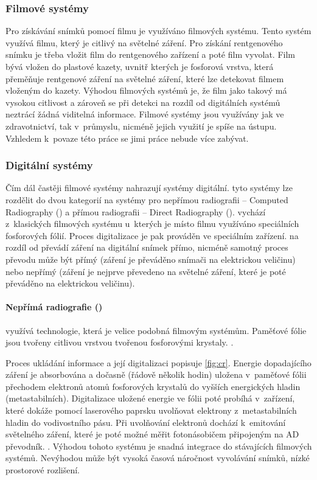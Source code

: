 \subsubsection{Filmové systémy}
Pro získávání snímků pomocí filmu je využíváno filmových systému. Tento systém využívá filmu, který je citlivý na světelné záření. Pro získání rentgenového snímku je třeba vložit film do rentgenového zařízení a poté film vyvolat. Film bývá vložen do plastové kazety, uvnitř kterých je fosforová vrstva, která přeměňuje rentgenové záření na světelné záření, které lze detekovat filmem vloženým do kazety. Výhodou filmových systémů je, že film jako takový má vysokou citlivost a zároveň se při detekci na rozdíl od digitálních systémů neztrácí žádná viditelná informace. \cite[str.~155]{Diagnostic-Radiology-Physics} Filmové systémy jsou využívány jak ve zdravotnictví, tak v~průmyslu, nicméně jejich využití je spíše na ústupu. Vzhledem k~povaze této práce se jimi práce nebude více zabývat.

\subsubsection{Digitální systémy}
Čím dál častěji filmové systémy nahrazují systémy digitální. tyto systémy lze rozdělit do dvou kategorií na systémy pro nepřímou radiografii -- Computed Radiography () a přímou radiografii -- Direct Radiography  ().  vychází z~klasických filmových systému u~kterých je místo filmu využíváno speciálních fosforových fólií. Proces digitalizace je pak prováděn ve speciálním zařízení.
 na rozdíl od  převádí záření na digitální snímek přímo, nicméně samotný proces převodu může být přímý (záření je převáděno snímači na elektrickou veličinu) nebo nepřímý (záření je nejprve převedeno na světelné záření, které je poté převáděno na elektrickou veličinu). \cite[str.~676]{Advances-in-Digital-Radiography}

\paragraph{Nepřímá radiografie ()}
využívá technologie, která je velice podobná filmovým systémům. Paměťové fólie jsou tvořeny citlivou vrstvou tvořenou fosforovými krystaly. \cite[str.~676]{Advances-in-Digital-Radiography}. 

Proces ukládání informace a její digitalizaci popisuje \cref{fig:cr}. Energie dopadajícího záření je absorbována a dočasně (řádově několik hodin) uložena v~paměťové fólii přechodem elektronů atomů fosforových krystalů do vyšších energických hladin (metastabilních). Digitalizace uložené energie ve fólii poté probíhá v~zařízení, které dokáže pomocí laserového paprsku uvolňovat elektrony z~metastabilních hladin do vodivostního pásu. Při uvolňování elektronů dochází k~emitování světelného záření, které je poté možné měřit fotonásobičem připojeným na AD převodník. \cite[str.~677]{Advances-in-Digital-Radiography}. Výhodou tohoto systému je snadná integrace do stávajících filmových systémů. Nevýhodou může být vysoká časová náročnost vyvolávání snímků, nízké prostorové rozlišení. \cite[str~209]{Diagnostic-Radiology}

